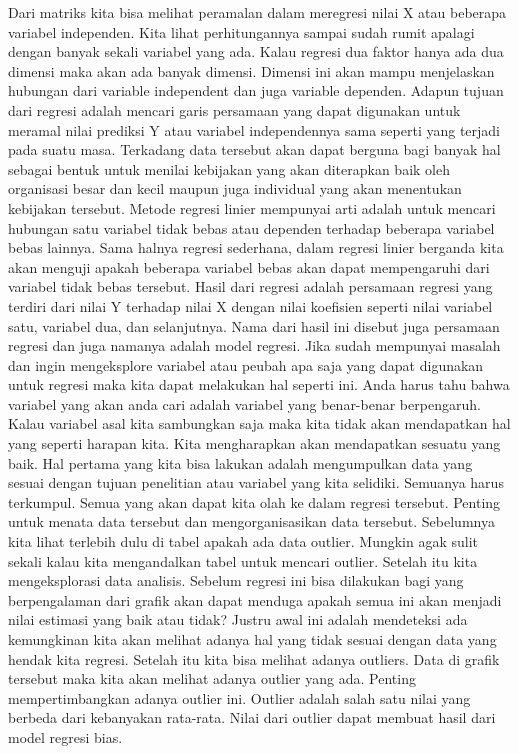 \documentclass[
]{book}
\theoremstyle{definition}
\theoremstyle{definition}
\theoremstyle{definition}
\theoremstyle{definition}
\theoremstyle{remark}
\begin{document}
Dari matriks kita bisa melihat peramalan dalam meregresi nilai X atau beberapa variabel independen. Kita lihat perhitungannya sampai sudah rumit apalagi dengan banyak sekali variabel yang ada. Kalau regresi dua faktor hanya ada dua dimensi maka akan ada banyak dimensi. Dimensi ini akan mampu menjelaskan hubungan dari variable independent dan juga variable dependen.
Adapun tujuan dari regresi adalah mencari garis persamaan yang dapat digunakan untuk meramal nilai prediksi Y atau variabel independennya sama seperti yang terjadi pada suatu masa. Terkadang data tersebut akan dapat berguna bagi banyak hal sebagai bentuk untuk menilai kebijakan yang akan diterapkan baik oleh organisasi besar dan kecil maupun juga individual yang akan menentukan kebijakan tersebut.
Metode regresi linier mempunyai arti adalah untuk mencari hubungan satu variabel tidak bebas atau dependen terhadap beberapa variabel bebas lainnya. Sama halnya regresi sederhana, dalam regresi linier berganda kita akan menguji apakah beberapa variabel bebas akan dapat mempengaruhi dari variabel tidak bebas tersebut.
Hasil dari regresi adalah persamaan regresi yang terdiri dari nilai Y terhadap nilai X dengan nilai koefisien seperti nilai variabel satu, variabel dua, dan selanjutnya. Nama dari hasil ini disebut juga persamaan regresi dan juga namanya adalah model regresi.
Jika sudah mempunyai masalah dan ingin mengeksplore variabel atau peubah apa saja yang dapat digunakan untuk regresi maka kita dapat melakukan hal seperti ini. Anda harus tahu bahwa variabel yang akan anda cari adalah variabel yang benar-benar berpengaruh. Kalau variabel asal kita sambungkan saja maka kita tidak akan mendapatkan hal yang seperti harapan kita. Kita mengharapkan akan mendapatkan sesuatu yang baik.
Hal pertama yang kita bisa lakukan adalah mengumpulkan data yang sesuai dengan tujuan penelitian atau variabel yang kita selidiki. Semuanya harus terkumpul. Semua yang akan dapat kita olah ke dalam regresi tersebut.
Penting untuk menata data tersebut dan mengorganisasikan data tersebut. Sebelumnya kita lihat terlebih dulu di tabel apakah ada data outlier. Mungkin agak sulit sekali kalau kita mengandalkan tabel untuk mencari outlier.
Setelah itu kita mengeksplorasi data analisis. Sebelum regresi ini bisa dilakukan bagi yang berpengalaman dari grafik akan dapat menduga apakah semua ini akan menjadi nilai estimasi yang baik atau tidak? Justru awal ini adalah mendeteksi ada kemungkinan kita akan melihat adanya hal yang tidak sesuai dengan data yang hendak kita regresi.
Setelah itu kita bisa melihat adanya outliers. Data di grafik tersebut maka kita akan melihat adanya outlier yang ada. Penting mempertimbangkan adanya outlier ini. Outlier adalah salah satu nilai yang berbeda dari kebanyakan rata-rata. Nilai dari outlier dapat membuat hasil dari model regresi bias.
\end{document}
